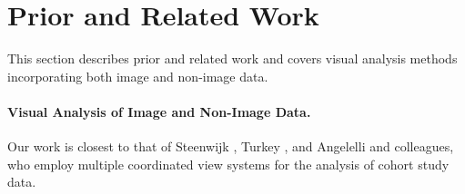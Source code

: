 \documentclass[journal]{style/vgtc} 			          %
\begin{document}
%

\section{Prior and Related Work}

This section describes prior and related work and covers visual analysis 
methods incorporating both image and non-image data. 

\paragraph{Visual Analysis of Image and Non-Image Data.}

Our work is closest to that of Steenwijk \cite{Steenwijk2010}, Turkey \cite{Turkay2013}, and Angelelli \cite{Angelelli2014} and colleagues, who employ multiple coordinated view systems for the analysis of cohort study data.
%
\end{document}
